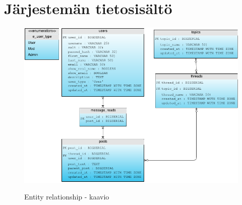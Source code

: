 \documentclass[10pt]{article}
\begin{document}
\section{Järjestemän tietosisältö}
\begin{figure}
  \caption{Entity relationship - kaavio}
  \centering
  \includegraphics[width=\textwidth, keepaspectratio]{ERDiagram}
  \label{fig:erdiagram}
\end{figure}
\end{document}
